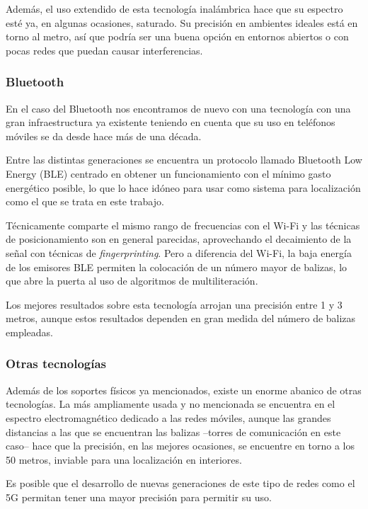 Además, el uso extendido de esta tecnología inalámbrica hace que su espectro esté ya, en algunas ocasiones, saturado.
Su precisión en ambientes ideales está en torno al metro, así que podría ser una buena opción en entornos abiertos o con pocas redes que puedan causar interferencias.

\subsubsection{Bluetooth}

En el caso del Bluetooth nos encontramos de nuevo con una tecnología con una gran infraestructura ya existente teniendo en cuenta que su uso en teléfonos móviles se da desde hace más de una década.

Entre las distintas generaciones se encuentra un protocolo llamado Bluetooth Low Energy (BLE) centrado en obtener un funcionamiento con el mínimo gasto energético posible, lo que lo hace idóneo para usar como sistema para localización como el que se trata en este trabajo.

Técnicamente comparte el mismo rango de frecuencias con el Wi-Fi y las técnicas de posicionamiento son en general parecidas, aprovechando el decaimiento de la señal con técnicas de \textit{fingerprinting}.
Pero a diferencia del Wi-Fi, la baja energía de los emisores BLE permiten la colocación de un número mayor de balizas, lo que abre la puerta al uso de algoritmos de multiliteración.

Los mejores resultados sobre esta tecnología arrojan una precisión entre 1 y 3 metros, aunque estos resultados dependen en gran medida del número de balizas empleadas.

\subsubsection{Otras tecnologías}

Además de los soportes físicos ya mencionados, existe un enorme abanico de otras tecnologías.
La más ampliamente usada y no mencionada se encuentra en el espectro electromagnético dedicado a las redes móviles, aunque las grandes distancias a las que se encuentran las balizas --torres de comunicación en este caso-- hace que la precisión, en las mejores ocasiones, se encuentre en torno a los 50 metros, inviable para una localización en interiores.

Es posible que el desarrollo de nuevas generaciones de este tipo de redes como el 5G permitan tener una mayor precisión para permitir su uso.

